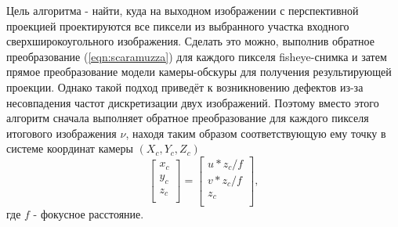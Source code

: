Цель алгоритма - найти, куда на выходном изображении  с  перспективной проекцией проектируются все пиксели из 
выбранного участка входного сверхширокоугольного изображения. Сделать это можно, выполнив обратное преобразование 
(\ref{eqn:scaramuzza}) для каждого пикселя fisheye-снимка и затем прямое преобразование модели камеры-обскуры 
для получения результирующей проекции. Однако такой подход приведёт к возникновению дефектов из-за несовпадения %
частот дискретизации двух изображений.  Поэтому вместо этого алгоритм сначала выполняет обратное преобразование  для 
каждого пикселя итогового изображения $\nu$, находя таким образом соответствующую ему точку в системе координат 
камеры $({X_c, Y_c, Z_c})$ 
\begin{equation}
    \label{eq:uv_to_xyz}
    \left[\begin{matrix}x_c\\y_c\\z_c\\\end{matrix}\right] = \left[\begin{matrix} {u*z_c}/f \\  {v*z_c}/f \\ z_c \\\end{matrix}\right],
\end{equation} 
где  $f$ - фокусное расстояние. 

